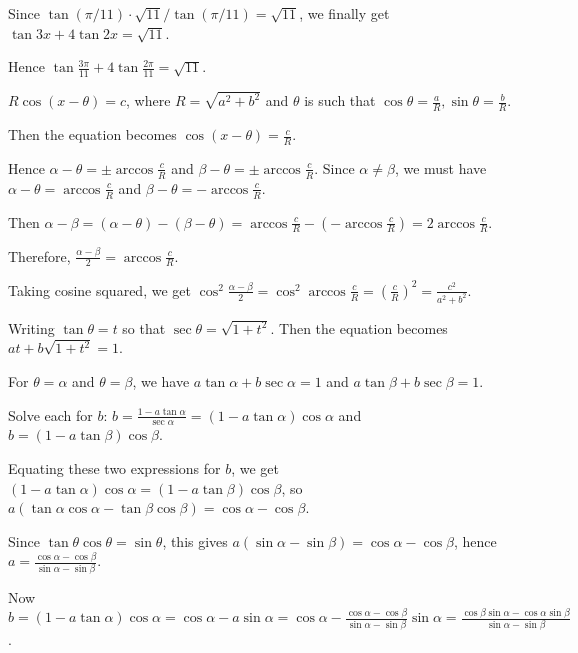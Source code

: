   Since $\tan (\pi/11) \cdot \sqrt{11}/\tan(\pi/11) = \sqrt{11}$, we finally get $\tan 3x + 4 \tan 2x
  = \sqrt{11}$.

  Hence $\tan\frac{3\pi}{11} + 4 \tan\frac{2\pi}{11} = \sqrt{11}$.
\item $R \cos(x - \theta) = c$, where $R = \sqrt{a^2 + b^2}$ and $\theta$ is such that $\cos \theta
  = \frac{a}{R}, \sin \theta = \frac{b}{R}$.

  Then the equation becomes $\cos(x - \theta) = \frac{c}{R}$.

  Hence $\alpha - \theta = \pm \arccos \frac{c}{R}$ and $\beta - \theta = \pm \arccos \frac{c}{R}$. Since
  $\alpha \neq \beta$, we must have $\alpha - \theta = \arccos \frac{c}{R}$ and $\beta - \theta =
  -\arccos \frac{c}{R}$.

  Then $\alpha - \beta = (\alpha - \theta) - (\beta - \theta) = \arccos \frac{c}{R} - (-\arccos \frac{c}{R})
  = 2 \arccos \frac{c}{R}$.

  Therefore, $\frac{\alpha - \beta}{2} = \arccos \frac{c}{R}$.

  Taking cosine squared, we get $\cos^2 \frac{\alpha - \beta}{2} = \cos^2 \arccos \frac{c}{R}
  = \left( \frac{c}{R} \right)^2 = \frac{c^2}{a^2 + b^2}$.
\item Writing $\tan \theta = t$ so that $\sec \theta = \sqrt{1 + t^2}$. Then the equation becomes $a t +
  b \sqrt{1 + t^2} = 1$.

  For $\theta = \alpha$ and $\theta = \beta$, we have $a \tan \alpha + b \sec \alpha = 1$ and $a \tan \beta
  + b \sec \beta = 1$.

  Solve each for $b$: $b = \frac{1 - a \tan \alpha}{\sec \alpha} = (1 - a \tan \alpha) \cos \alpha$ and $b =
  (1 - a \tan \beta) \cos \beta$.

  Equating these two expressions for $b$, we get $(1 - a \tan \alpha) \cos \alpha = (1 -
  a \tan \beta) \cos \beta$, so $a (\tan \alpha \cos \alpha - \tan \beta \cos \beta) = \cos \alpha
  - \cos \beta$.

  Since $\tan \theta \cos \theta = \sin \theta$, this gives $a (\sin \alpha - \sin \beta) = \cos \alpha
  - \cos \beta$, hence $a = \frac{\cos \alpha - \cos \beta}{\sin \alpha - \sin \beta}$.

  Now $b = (1 - a \tan \alpha) \cos \alpha = \cos \alpha - a \sin \alpha = \cos \alpha - \frac{\cos \alpha
    - \cos \beta}{\sin \alpha - \sin \beta} \sin \alpha = \frac{\cos \beta \sin \alpha
    - \cos \alpha \sin \beta}{\sin \alpha - \sin \beta}$.

